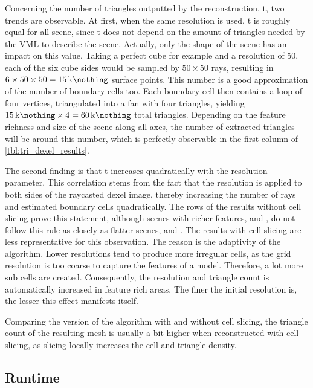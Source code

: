 Concerning the number of triangles outputted by the reconstruction, t, two trends are observable.
At first, when the same resolution is used, t is roughly equal for all scene, since t does not depend on the amount of triangles needed by the VML to describe the scene.
Actually, only the shape of the scene has an impact on this value.
Taking a perfect cube for example and a resolution of 50, each of the six cube sides would be sampled by $50\times50$ rays, resulting in $6 \times 50 \times 50 = \SI{15}{\kilo\nothing}$ surface points.
This number is a good approximation of the number of boundary cells too.
Each boundary cell then contains a loop of four vertices, triangulated into a fan with four triangles, yielding $\SI{15}{\kilo\nothing} \times 4 = \SI{60}{\kilo\nothing}$ total triangles.
Depending on the feature richness and size of the scene along all axes, the number of extracted triangles will be around this number, which is perfectly observable in the first column of \cref{tbl:tri_dexel_results}.

The second finding is that t increases quadratically with the resolution parameter.
This correlation stems from the fact that the resolution is applied to both sides of the raycasted dexel image, thereby increasing the number of rays and estimated boundary cells quadratically.
The rows of the results without cell slicing prove this statement, although scenes with richer features, \eg \cylinderhead and \impeller, do not follow this rule as closely as flatter scenes, \eg \cubes and \cylinders.
The results with cell slicing are less representative for this observation.
The reason is the adaptivity of the algorithm.
Lower resolutions tend to produce more irregular cells, as the grid resolution is too coarse to capture the features of a model.
Therefore, a lot more sub cells are created.
Consequently, the resolution and triangle count is automatically increased in feature rich areas.
The finer the initial resolution is, the lesser this effect manifests itself.

Comparing the version of the algorithm with and without cell slicing, the triangle count of the resulting mesh is usually a bit higher when reconstructed with cell slicing, as slicing locally increases the cell and triangle density.


\subsection{Runtime}
\label{sec:tri_dexel_runtime}

